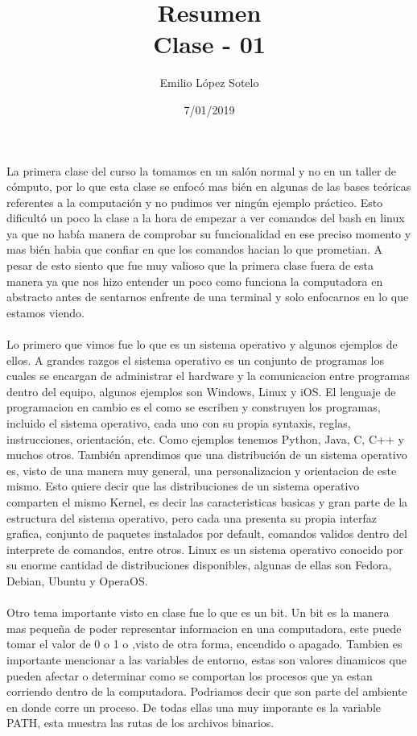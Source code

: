 \documentclass[letterpaper, 12pt, oneside]{article}
\title{Resumen\\Clase - 01}
\author{Emilio López Sotelo}
\date{7/01/2019}
\begin{document}
	\maketitle
	La primera clase del curso la tomamos en un salón normal y no en un taller de cómputo, por lo que esta clase se enfocó mas bién en algunas de las bases teóricas referentes a la computación y no pudimos ver ningún ejemplo práctico. Esto dificultó un poco la clase a la hora de empezar a ver comandos del bash en linux ya que no había manera de comprobar su funcionalidad en ese preciso momento y mas bién habia que confiar en que los comandos hacian lo que prometian. A pesar de esto siento que fue muy valioso que la primera clase fuera de esta manera ya que nos hizo entender un poco como funciona la computadora en abstracto antes de sentarnos enfrente de una terminal y solo enfocarnos en lo que estamos viendo.
	\\
	\\ 
	Lo primero que vimos fue lo que es un sistema operativo y algunos ejemplos de ellos. A grandes razgos el sistema operativo es un conjunto de programas los cuales se encargan de administrar el hardware y la comunicacion entre programas dentro del equipo, algunos ejemplos son Windows, Linux y iOS. El lenguaje de programacion en cambio es el como se escriben y construyen los programas, incluido el sistema operativo, cada uno con su propia syntaxis, reglas, instrucciones, orientación, etc. Como ejemplos tenemos Python, Java, C, C++ y muchos otros. También aprendimos que una distribución de un sistema operativo es, visto de una manera muy general, una personalizacion y orientacion de este mismo. Esto quiere decir que las distribuciones de un sistema operativo comparten el mismo Kernel, es decir las caracteristicas basicas y gran parte de la estructura del sistema operativo, pero cada una presenta su propia interfaz grafica, conjunto de paquetes instalados por default, comandos validos dentro del interprete de comandos, entre otros. Linux es un sistema operativo conocido por su enorme cantidad de distribuciones disponibles, algunas de ellas son Fedora, Debian, Ubuntu y OperaOS.
	\\
	\\
	Otro tema importante visto en clase fue lo que es un bit. Un bit es la manera mas pequeña de poder representar informacion en una computadora, este puede tomar el valor de 0 o 1 o ,visto de otra forma, encendido o apagado. Tambien es importante mencionar a las variables de entorno, estas son valores dinamicos que pueden afectar o determinar como se comportan los procesos que ya estan corriendo dentro de la computadora. Podriamos decir que son parte del ambiente en donde corre un proceso. De todas ellas una muy imporante es la variable PATH, esta muestra las rutas de los archivos binarios. 
\end{document}
